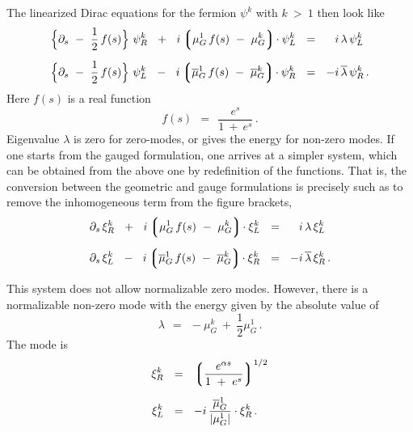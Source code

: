 \documentclass[epsfig,12pt]{article}
\def\beq{\begin{equation}}
\def\eeq{\end{equation}}
\def\beq{\begin{equation}}
\def\eeq{\end{equation}}
\newcommand{\p}{\partial}
\newcommand{\ov}{\overline}
\newcommand{\lgr}{\left\lgroup}
\newcommand{\rgr}{\right\rgroup}
\begin{document}
	The linearized Dirac equations for the fermion $ \psi^k $ with $ k ~>~ 1 $ then look like
\begin{align}
%
\notag
	\Big\{ \p_s  ~-~ \frac{1}{2}\, f(s) \Big\}\,\, \psi_R^k   ~~+~~  i \lgr  \mu_G^1\, f(s)  ~-~  \mu_G^k \rgr\! \cdot \psi_L^k  
	& ~~=~~ \phantom{-} i\, \lambda\, \psi_L^k   \\[2mm]
%
	\Big\{ \p_s  ~-~ \frac{1}{2}\, f(s) \Big\}\,\, \psi_L^k   ~~-~~  i \lgr \ov{\mu}{}_G^1\, f(s)  ~-~ \ov{\mu}{}_G^k \rgr\! \cdot \psi_R^k 
	& ~~=~~ - i\, \ov{\lambda}\, \psi_R^k \,.
\end{align}
	Here $ f(s) $ is a real function
\beq
	f(s) ~~=~~ \frac{     e^s     }
 	                { 1  ~+~  e^s }\,.
\eeq
	Eigenvalue $ \lambda $ is zero for zero-modes, or gives the energy for non-zero modes.
	If one starts from the gauged formulation, one arrives at a simpler system, which can be obtained from the
	above one by redefinition of the functions.
	That is, the conversion between the geometric and gauge formulations is precisely such as to remove the inhomogeneous term from the
	figure brackets,
\begin{align}
%
\notag
	\p_s\, \xi_R^k  ~~+~~  i \lgr \mu_G^1\, f(s) ~-~ \mu_G^k \rgr\! \cdot \xi_L^k  & ~~=~~ \phantom{-} i\, \lambda\, \xi_L^k \\[2mm]
%
	\p_s\, \xi_L^k  ~~-~~  i \lgr \ov{\mu}{}_G^1\, f(s) ~-~ \ov{\mu}{}_G^k \rgr\! \cdot \xi_R^k & ~~=~~ - i\, \ov{\lambda}\, \xi_R^k \,.
\end{align}
       
	This system does not allow normalizable zero modes.
	However, there is a normalizable non-zero mode with the energy given by the absolute value of 
\beq
       \lambda  ~~=~~  - \mu_G^k  ~+~ \frac{1}{2} \mu_G^1\,.
\eeq
	The mode is
\begin{align}
%
\notag
	\xi_R^k  & ~~=~~  \lgr \frac{  e^{\alpha s}  }
	                            {   1 ~+~ e^s    }  \rgr^{ 1/2 }  \\[2mm]
%
	\xi_L^k  & ~~=~~  - i\, \frac{ \ov{\mu}{}_G^1 }
	                             {  | \mu_G^1 |   } \cdot \xi_R^k\,.
\end{align}
	
\end{document}
